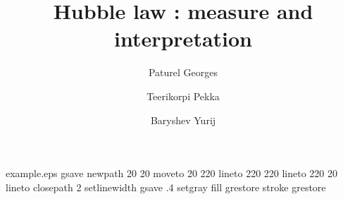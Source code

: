 %
%
%
%
\begin{filecontents*}{example.eps}
gsave
newpath
  20 20 moveto
  20 220 lineto
  220 220 lineto
  220 20 lineto
closepath
2 setlinewidth
gsave
  .4 setgray fill
grestore
stroke
grestore
\end{filecontents*}
%
\RequirePackage{fix-cm}
%
\documentclass[smallextended]{svjour3}       %
%
\smartqed  %
%
\usepackage{graphicx}
%
%
%
%
%


\title{Hubble law :  measure and interpretation }



\author{Paturel Georges \and 
Teerikorpi Pekka \and 
Baryshev Yurij }


